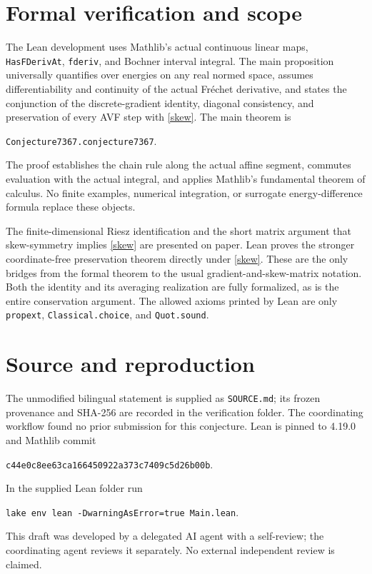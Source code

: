 \documentclass[10pt]{article}
\begin{document}
\section*{Formal verification and scope}
The Lean development uses Mathlib's actual continuous linear maps,
\texttt{HasFDerivAt}, \texttt{fderiv}, and Bochner interval integral.
The main proposition universally quantifies over energies on any real
normed space, assumes differentiability and continuity of the actual
Fr\'echet derivative, and states the conjunction of the discrete-gradient
identity, diagonal consistency, and preservation of every AVF step with
\eqref{skew}. The main theorem is
\begin{center}\texttt{Conjecture7367.conjecture7367}.\end{center}
The proof establishes the chain rule along the actual affine segment,
commutes evaluation with the actual integral, and applies Mathlib's
fundamental theorem of calculus. No finite examples, numerical integration,
or surrogate energy-difference formula replace these objects.

The finite-dimensional Riesz identification and the short matrix argument
that skew-symmetry implies \eqref{skew} are presented on paper. Lean
proves the stronger coordinate-free preservation theorem directly under
\eqref{skew}. These are the only bridges from the formal theorem to the
usual gradient-and-skew-matrix notation. Both the identity and its
averaging realization are fully formalized, as is the entire conservation
argument. The allowed axioms printed by Lean are only
\texttt{propext}, \texttt{Classical.choice}, and \texttt{Quot.sound}.

\section*{Source and reproduction}
The unmodified bilingual statement is supplied as \texttt{SOURCE.md};
its frozen provenance and SHA-256 are recorded in the verification folder.
The coordinating workflow found no prior submission for this conjecture.
Lean is pinned to 4.19.0 and Mathlib commit
\begin{center}\texttt{c44e0c8ee63ca166450922a373c7409c5d26b00b}.\end{center}
In the supplied Lean folder run
\begin{center}\texttt{lake env lean -DwarningAsError=true Main.lean}.\end{center}
This draft was developed by a delegated AI agent with a self-review;
the coordinating agent reviews it separately. No external independent
review is claimed.
\end{document}
